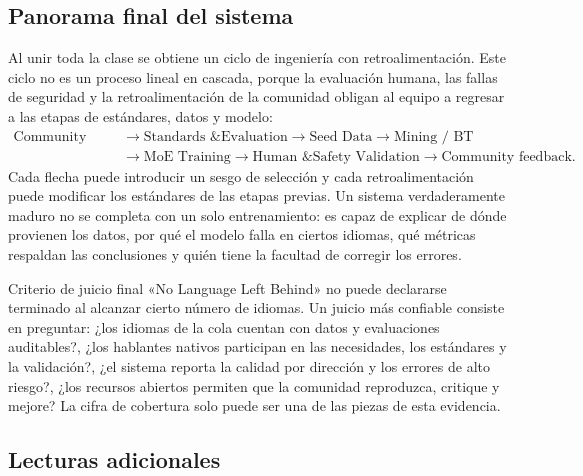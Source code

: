 \documentclass[a4paper]{article}
\begin{document}
\subsection{Panorama final del sistema}

Al unir toda la clase se obtiene un ciclo de ingeniería con retroalimentación. Este ciclo no es un proceso lineal en cascada, porque la evaluación humana, las fallas de seguridad y la retroalimentación de la comunidad obligan al equipo a regresar a las etapas de estándares, datos y modelo:
\[
\begin{aligned}
\text{Community needs}
&\rightarrow\text{Standards \& Evaluation}
\rightarrow\text{Seed Data}
\rightarrow\text{Mining / BT}\\
&\rightarrow\text{MoE Training}
\rightarrow\text{Human \& Safety Validation}
\rightarrow\text{Community feedback}.
\end{aligned}
\]
Cada flecha puede introducir un sesgo de selección y cada retroalimentación puede modificar los estándares de las etapas previas. Un sistema verdaderamente maduro no se completa con un solo entrenamiento: es capaz de explicar de dónde provienen los datos, por qué el modelo falla en ciertos idiomas, qué métricas respaldan las conclusiones y quién tiene la facultad de corregir los errores.

\begin{importantbox}{Criterio de juicio final}
«No Language Left Behind» no puede declararse terminado al alcanzar cierto número de idiomas. Un juicio más confiable consiste en preguntar: ¿los idiomas de la cola cuentan con datos y evaluaciones auditables?, ¿los hablantes nativos participan en las necesidades, los estándares y la validación?, ¿el sistema reporta la calidad por dirección y los errores de alto riesgo?, ¿los recursos abiertos permiten que la comunidad reproduzca, critique y mejore? La cifra de cobertura solo puede ser una de las piezas de esta evidencia.
\end{importantbox}

\subsection{Lecturas adicionales}
\end{document}
